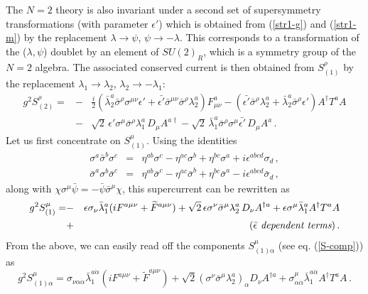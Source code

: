 The $N=2$ theory is also invariant under a second set of supersymmetry
transformations (with parameter $\epsilon'$) which is obtained from
(\ref{str1-g}) and (\ref{str1-m}) by the replacement
$\lambda\rightarrow\psi$, $\psi\rightarrow -\lambda$. This corresponds
to a transformation of the ($\lambda,\psi$) doublet by an element of
$SU(2)_R$, which is a symmetry group of the $N=2$ algebra.  The
associated conserved current is then obtained from $S^\rho_{(1)}$ by
the replacement $\lambda_1 \rightarrow\lambda_2$,
$\lambda_2\rightarrow-\lambda_1$:
\begin{eqnarray}
g^2 S^\rho_{(2)}=&-&\frac{i}{2}\left(\bar{\lambda}^a_2\bar{\sigma}^\rho
\sigma^{\mu\nu}\epsilon' + \bar{\epsilon'}\bar{\sigma}^{\mu\nu}
\bar{\sigma}^\rho \lambda^a_2 \right) F^a_{\mu\nu} -
\left(\bar{\epsilon'}\bar{\sigma}^\rho\lambda^a_{2}+\bar{\lambda}^a_{2}
\bar{\sigma}^\rho \epsilon'\right) A^\dagger T^a A 
\nonumber \\
&-&\sqrt{2}\,\epsilon'\sigma^\mu \bar{\sigma}^\rho\lambda^a_{1}\,D_\mu
A^{a\dagger}-\sqrt{2}\,\bar{\lambda}^a_{1}\bar{\sigma}^\rho \sigma^\mu
\bar{\epsilon'}\, D_\mu A^a \,.\nonumber 
\end{eqnarray}
Let us first concentrate on $S^\mu_{(1)}$. Using the identities 
\begin{eqnarray}
\sigma^a \bar{\sigma}^b \sigma^c &=& \eta^{ab} \sigma^c - \eta^{ac}
\sigma^b + \eta^{bc} \sigma^a + i \epsilon^{abcd} \sigma_d \,, 
\nonumber\\
\bar{\sigma}^a \sigma^b \bar{\sigma}^c &=& \eta^{ab} \bar{\sigma}^c
- \eta^{ac} \bar{\sigma}^b + \eta^{bc} \bar{\sigma}^a - i
\epsilon^{abcd} \bar{\sigma}_d \nonumber\,,
\end{eqnarray}
along with $\chi\sigma^\mu\bar\psi=-\bar\psi\bar\sigma^\mu\chi$, this
supercurrent can be rewritten as 
\begin{eqnarray}
g^2S^\mu_{(1)}=&-&\epsilon\sigma_\nu\bar{\lambda}^a_{1}(iF^{a\mu\nu}+ 
\widetilde F^{a\mu\nu})+\sqrt{2}\,\epsilon\sigma^\nu\bar{\sigma}^\mu
\lambda^a_{2}\,D_\nu A^{\dagger a}+\epsilon\sigma^\mu 
\bar{\lambda}^a_{1} A^\dagger T^a A \nonumber \\
&+& (\mbox{\it $\bar\epsilon$ dependent terms})\,.\nonumber
\end{eqnarray}
From the above, we can easily read off the components
$S^\mu_{(1)\alpha}$ (see eq. (\ref{S-comp})) as
$$
g^2 S^\mu_{(1)\alpha}= \sigma_{\nu\alpha\dot\alpha}
\bar{\lambda}^{a\dot\alpha}_{1} (iF^{a\mu\nu}+\widetilde F^{a\mu\nu})
+\sqrt{2}(\sigma^\nu\bar{\sigma}^\mu\lambda^a_{2})_\alpha D_\nu 
A^{\dagger a}+\sigma^\mu_{\alpha\dot{\alpha}}
\bar{\lambda}^{a\dot{\alpha}}_{1} A^\dagger T^a A\,. 
$$
